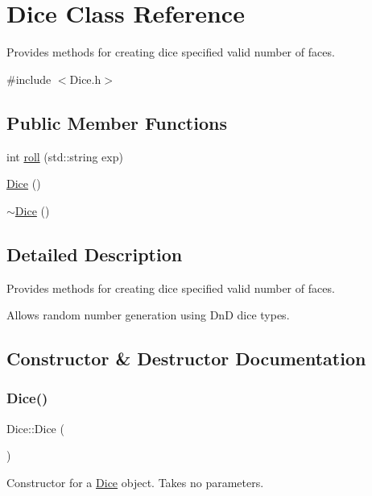 \hypertarget{class_dice}{}\section{Dice Class Reference}
\label{class_dice}


Provides methods for creating dice specified valid number of faces.  




{\ttfamily \#include $<$Dice.\+h$>$}

\subsection*{Public Member Functions}
\begin{DoxyCompactItemize}
\item 
int \hyperlink{class_dice_a0bc8f4b697804af0785f34b801cd6feb}{roll} (std\+::string exp)
\item 
\hyperlink{class_dice_a6b9eadd945ad8fd3840379c8824e5d48}{Dice} ()
\item 
\hyperlink{class_dice_a48e90392d2ff1e6736c88f22e8a87751}{$\sim$\+Dice} ()
\end{DoxyCompactItemize}


\subsection{Detailed Description}
Provides methods for creating dice specified valid number of faces. 

Allows random number generation using DnD dice types. 

\subsection{Constructor \& Destructor Documentation}
\hypertarget{class_dice_a6b9eadd945ad8fd3840379c8824e5d48}{}\label{class_dice_a6b9eadd945ad8fd3840379c8824e5d48} 
\subsubsection{\texorpdfstring{Dice()}{Dice()}}
{\footnotesize\ttfamily Dice\+::\+Dice (\begin{DoxyParamCaption}{ }\end{DoxyParamCaption})}

Constructor for a \hyperlink{class_dice}{Dice} object. Takes no parameters. \hypertarget{class_dice_a48e90392d2ff1e6736c88f22e8a87751}{}\label{class_dice_a48e90392d2ff1e6736c88f22e8a87751} 
